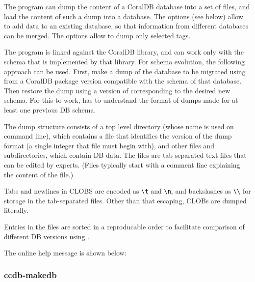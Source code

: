 The  program can dump the content of a CoralDB
database into a set of files, and load the content of such a dump
into a database.  The  options (see below) allow
to add data to an existing database, so that information from
different databases can be merged.  The  options
allow to dump only selected tags.

The  program is linked against the CoralDB
library, and can work only with the schema that is implemented by
that library.  For schema evolution, the following approach can
be used.  First, make a dump of the database to be migrated using
 from a CoralDB package version compatible
with the schema of that database.  Then restore the dump using a
version of  corresponding to the desired new
schema.   For this to work,  has to understand 
the format of dumps made for at least one previous DB schema.

The dump structure consists of a top level directory (whose name
is used on  command line), which contains a
 file that identifies the version of
the dump format (a single integer that file must begin with), and
other files and subdirectories, which contain DB data.  The files
are tab-separated text files that can be edited by
experts. (Files typically start with a comment line explaining
the content of the file.)

Tabs and newlines in CLOBS are encoded as \verb|\t| and
\verb|\n|, and backslashes as \verb|\\| for storage in the
tab-separated files.  Other than that escaping, CLOBs are dumped
literally.

Entries in the files are sorted in a reproducable order to
facilitate comparison of different DB versions using
.

The  online help message is shown below:





\clearpage
\subsubsection{ccdb-makedb}

